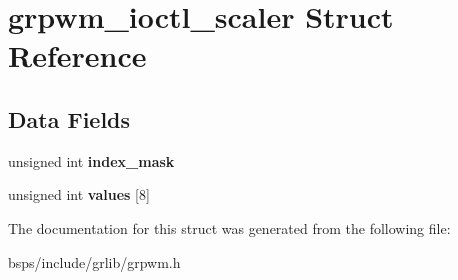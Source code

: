 \hypertarget{structgrpwm__ioctl__scaler}{}\section{grpwm\+\_\+ioctl\+\_\+scaler Struct Reference}
\label{structgrpwm__ioctl__scaler}
\subsection*{Data Fields}
\begin{DoxyCompactItemize}
\item 
\mbox{\label{structgrpwm__ioctl__scaler_ae8ddf0743d33b362c680f069ae1d3d21}} 
unsigned int {\bfseries index\+\_\+mask}
\item 
\mbox{\label{structgrpwm__ioctl__scaler_a99e295a309d9f42f8e07f164b2c546d7}} 
unsigned int {\bfseries values} \mbox{[}8\mbox{]}
\end{DoxyCompactItemize}


The documentation for this struct was generated from the following file\+:\begin{DoxyCompactItemize}
\item 
bsps/include/grlib/grpwm.\+h\end{DoxyCompactItemize}
